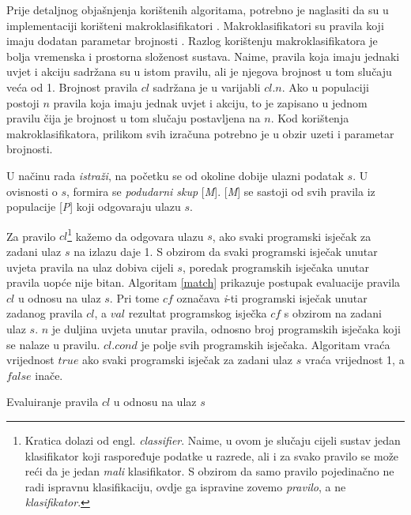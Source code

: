 \documentclass[times, utf8, zavrsni]{fer}
\begin{document}
Prije detaljnog objašnjenja korištenih algoritama, potrebno je naglasiti da su u implementaciji korišteni makroklasifikatori  \citep{2}.
Makroklasifikatori su pravila koji imaju dodatan parametar brojnosti .
Razlog korištenju makroklasifikatora je bolja vremenska i prostorna složenost sustava.
Naime, pravila koja imaju jednaki uvjet i akciju sadržana su u istom pravilu, ali je njegova brojnost u tom slučaju veća od 1.
Brojnost pravila $cl$ sadržana je u varijabli $cl.n$.
Ako u populaciji postoji $n$ pravila koja imaju jednak uvjet i akciju, to je zapisano u jednom pravilu čija je brojnost u tom slučaju postavljena na $n$.
Kod korištenja makroklasifikatora, prilikom svih izračuna potrebno je u obzir uzeti i parametar brojnosti.

U načinu rada \emph{istraži}, na početku se od okoline dobije ulazni podatak $s$.
U ovisnosti o $s$, formira se \emph{podudarni skup} [\emph{M}].
[\emph{M}] se sastoji od svih pravila iz populacije [\emph{P}] koji odgovaraju ulazu $s$.

Za pravilo $cl$\footnote{Kratica dolazi od engl. \emph{classifier}. Naime, u ovom je slučaju cijeli sustav jedan klasifikator koji raspoređuje podatke u razrede, ali i za svako pravilo se može reći da je jedan \emph{mali} klasifikator. S obzirom da samo pravilo pojedinačno ne radi ispravnu klasifikaciju, ovdje ga ispravine zovemo \emph{pravilo}, a ne \emph{klasifikator}.} kažemo da odgovara ulazu $s$, ako svaki programski isječak za zadani ulaz $s$ na izlazu daje 1.
S obzirom da svaki programski isječak unutar uvjeta pravila na ulaz dobiva cijeli $s$, poredak programskih isječaka unutar pravila uopće nije bitan.
Algoritam \ref{match} prikazuje postupak evaluacije pravila $cl$ u odnosu na ulaz $s$.
Pri tome $cf$ označava \emph{i}-ti programski isječak unutar zadanog pravila $cl$, a $val$ rezultat programskog isječka $cf$ s obzirom na zadani ulaz $s$.
$n$ je duljina uvjeta unutar pravila, odnosno broj programskih isječaka koji se nalaze u pravilu.
$cl.cond$ je polje svih programskih isječaka.
Algoritam vraća vrijednost $true$ ako svaki programski isječak za zadani ulaz $s$ vraća vrijednost 1, a $false$ inače.

\begin{algorithm}
    \caption{Evaluiranje pravila $cl$ u odnosu na ulaz $s$}
    \label{match}
    \begin{algorithmic}
        \ENDIF
        \ENDFOR
    \end{algorithmic}
\end{algorithm}
\end{document}
